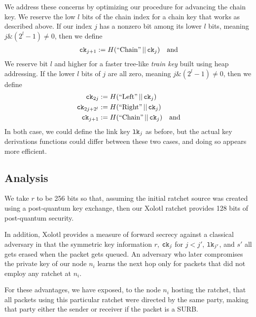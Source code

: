 \documentclass[twoside,letterpaper]{llncs}
\def\mathcomma{}
\begin{document}
We address these concerns by optimizing our procedure for advancing
the chain key.  We reserve the low $l$ bits of the chain index
for a chain key that works as described above.  
If our index $j$ has a nonzero bit among its lower $l$ bits,
meaning $j \& (2^l-1) \neq 0$, then
we define
\[ \begin{aligned}
 \ck_{j+1} &:= H(\textrm{``Chain''} \,||\, \ck_j) \quad\textrm{and} \\ %
\end{aligned} \]
We reserve bit $l$ and higher for a faster tree-like {\it train key}
built using heap addressing.  If the lower $l$ bits of $j$ are
all zero, meaning $j \& (2^l-1) \neq 0$, then we define 
\[ \begin{aligned}
 \ck_{2j} &:= H(\textrm{``Left''} \,||\, \ck_j) \mathcomma \\
 \ck_{2j+2^l} &:= H(\textrm{``Right''} \,||\, \ck_j) \mathcomma \\
 \ck_{j+1} &:= H(\textrm{``Chain''} \,||\, \ck_j) \quad\textrm{and} \\
\end{aligned} \]
In both case, we could define the link key $\texttt{lk}_j$ as before, but
the actual key derivations functions could differ between these two
cases, and doing so appears more efficient.


\subsection{Analysis}

We take $r$ to be 256 bits so that, assuming the initial ratchet
source was created using a post-quantum key exchange, then our
Xolotl ratchet provides 128 bits of post-quantum security.

In addition, Xolotl provides a measure of forward secrecy against
a classical adversary in that the symmetric key information $r$,
$\texttt{ck}_j$ for $j<j'$, $\texttt{lk}_{j'}$, and $s'$ all gets erased when
the packet gets queued.  An adversary who later compromises the
private key of our node $n_i$ learns the next hop only for packets
that did not employ any ratchet at $n_i$.

For these advantages, we have exposed,
 to the node $n_i$ hosting the ratchet, that all packets using this
particular ratchet were directed by the same party, making that
party either the sender or receiver if the packet is a SURB.
\end{document}
